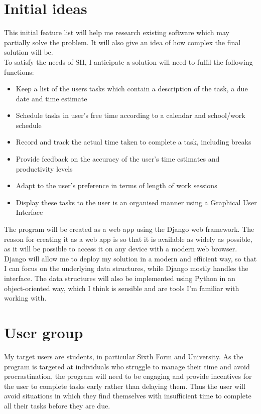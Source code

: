 \documentclass{article}
\begin{document}
\section{Initial ideas}
This initial feature list will help me research existing software which may
partially solve the problem. It will also give an idea of how complex the final
solution will be.\\

To satisfy the needs of SH, I anticipate a solution will need to fulfil the
following functions:

\begin{itemize}
\item Keep a list of the users tasks which contain a description of the task, a
  due date and time estimate
\item Schedule tasks in user's free time according to a calendar and school/work
  schedule
\item Record and track the actual time taken to complete a task, including
  breaks
\item Provide feedback on the accuracy of the user's time estimates and
  productivity levels
\item Adapt to the user's preference in terms of length of work sessions
\item Display these tasks to the user is an organised manner using a Graphical
  User Interface
\end{itemize}

The program will be created as a web app using the Django web framework. The
reason for creating it as a web app is so that it is available as widely as
possible, as it will be possible to access it on any device with a modern web
browser. Django will allow me to deploy my solution in a modern and efficient
way, so that I can focus on the underlying data structures, while Django mostly
handles the interface. The data structures will also be implemented using Python
in an object-oriented way, which I think is sensible and are tools I'm familiar
with working with.
\section{User group}
My target users are students, in particular Sixth Form and University. As the
program is targeted at individuals who struggle to manage their time and avoid
procrastination, the program will need to be engaging and provide incentives for
the user to complete tasks early rather than delaying them. Thus the user will
avoid situations in which they find themselves with insufficient time to
complete all their tasks before they are due.\\
\end{document}
